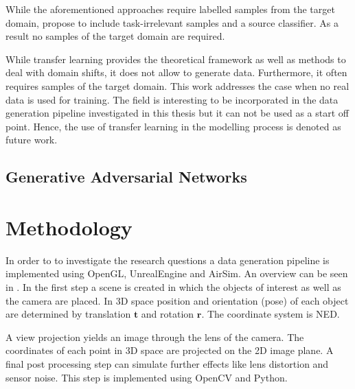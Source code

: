 While the aforementioned approaches require labelled samples from the target domain, \citeauthor{Peng2017} \cite{Peng2017} propose to include task-irrelevant samples and a source classifier. As a result no samples of the target domain are required.

While transfer learning provides the theoretical framework as well as methods to deal with domain shifts, it does not allow to generate data. Furthermore, it often requires samples of the target domain. This work addresses the case when no real data is used for training. The field is interesting to be incorporated in the data generation pipeline investigated in this thesis but it can not be used as a start off point. Hence, the use of transfer learning in the modelling process is denoted as future work.

\subsection{Generative Adversarial Networks}

\cite{Inoue} 

\section{Methodology}

In order to to investigate the research questions a data generation pipeline is implemented using OpenGL, UnrealEngine and AirSim. An overview can be seen in . In the first step a scene is created in which the objects of interest as well as the camera are placed. In 3D space position and orientation (pose) of each object are determined by translation $\textbf{t}$ and rotation $\textbf{r}$. The coordinate system is \ac{NED}.

A view projection yields an image through the lens of the camera. The coordinates of each point in 3D space are projected on the 2D image plane. A final post processing step can simulate further effects like lens distortion and sensor noise. This step is implemented using OpenCV and Python.

